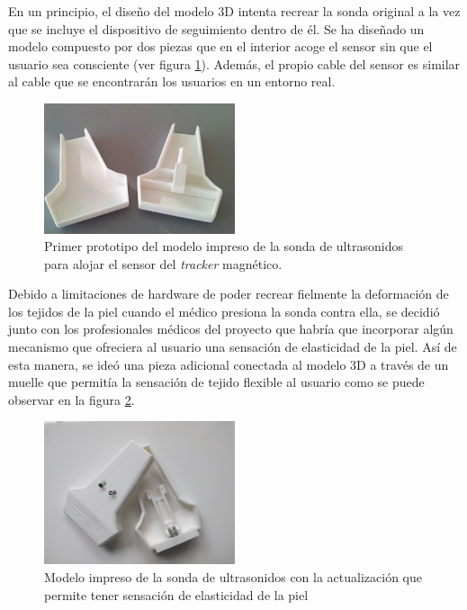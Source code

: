 En un principio, el diseño del modelo 3D intenta recrear la sonda original a la vez que se incluye el dispositivo de seguimiento dentro de él. Se ha diseñado un modelo compuesto por dos piezas que en el interior acoge el sensor sin que el usuario sea consciente (ver figura \ref{fig:m3d}). Además, el propio cable del sensor es similar al cable que se encontrarán los usuarios en un entorno real.

\begin{figure}[h]
    \centering
    \includegraphics[width=0.5\textwidth]{IMG/modelo3d.png}
    \caption{Primer prototipo del modelo impreso de la sonda de ultrasonidos para alojar el sensor del \emph{tracker} magnético.}
    \label{fig:m3d}
\end{figure}

Debido a limitaciones de hardware de poder recrear fielmente la deformación de los tejidos de la piel cuando el médico presiona la sonda contra ella, se decidió junto con los profesionales médicos del proyecto que habría que incorporar algún mecanismo que ofreciera al usuario una sensación de elasticidad de la piel. Así de esta manera, se ideó una pieza adicional conectada al modelo 3D a través de un muelle que permitía la sensación de tejido flexible al usuario como se puede observar en la figura \ref{fig:m3dv2}.

\begin{figure}[h]
    \centering
    \includegraphics[width=0.5\textwidth]{IMG/modelo3dv2.jpg}
    \caption{Modelo impreso de la sonda de ultrasonidos con la actualización que permite tener sensación de elasticidad de la piel }
    \label{fig:m3dv2}
\end{figure}


